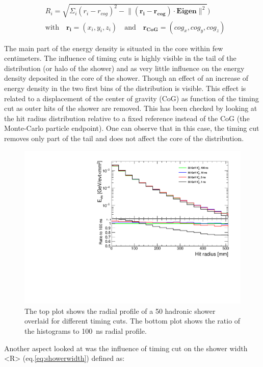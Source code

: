 \begin{equation} \label{eq:radialprof}
  \begin{split}
    & R_{i} = \sqrt{\Sigma_{i} (r_{i} - r_{cog})^{2} - \lVert (\mathbf{r_{i}} - \mathbf{r_{cog}}) \cdot \mathbf{Eigen} \rVert^{2}}) \\
    & \text{with} \quad \mathbf{r_{i}} = (x_i, y_i, z_i) \quad \text{and} \quad \mathbf{r_{CoG}} = (cog_x, cog_y, cog_z)
  \end{split}
\end{equation}

The main part of the energy density is situated in the core within few centimeters. The influence of timing cuts is highly visible in the tail of the distribution (or halo of the shower) and as very little influence on the energy density deposited in the core of the shower. Though an effect of an increase of energy density in the two first bins of the distribution is visible. This effect is related to a displacement of the center of gravity (CoG) as function of the timing cut as outer hits of the shower are removed. This has been checked by looking at the hit radius distribution relative to a fixed reference instead of the CoG (the Monte-Carlo particle endpoint). One can observe that in this case, the timing cut removes only part of the tail and does not affect the core of the distribution.

\begin{figure}[htbp!]
  \centering
  \includegraphics[width=0.7\linewidth]{../Thesis_Plots/ILD/NoSmearing/Plots/RadialProfileOverlay_noSmearing}
  \caption{The top plot shows the radial profile of a 50 \GeV hadronic shower overlaid for different timing cuts. The bottom plot shows the ratio of the histograms to \SI{100}{\nano\second} radial profile.} \label{fig:RadialProfNoSmearing}
\end{figure}

Another aspect looked at was the influence of timing cut on the shower width <R> (eq.\ref{eq:showerwidth}) defined as:

